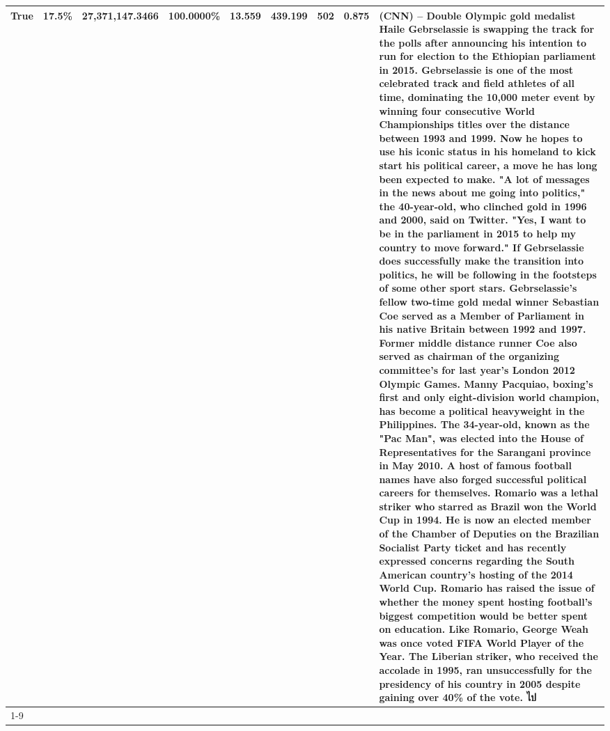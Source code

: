 \begin{table}[H]
{\begin{tabular}{lllrlllll}
True & 17.5\% & 27,371,147.3466 & \bfseries \color{red} 100.0000\% & 13.559 & 439.199 & 502 & 0.875 & (CNN) -- Double Olympic gold medalist Haile Gebrselassie is swapping the track for the polls after announcing his intention to run for election to the Ethiopian parliament in 2015. Gebrselassie is one of the most celebrated track and field athletes of all time, dominating the 10,000 meter event by winning four consecutive World Championships titles over the distance between 1993 and 1999. Now he hopes to use his iconic status in his homeland to kick start his political career, a move he has long been expected to make. "A lot of messages in the news about me going into politics," the 40-year-old, who clinched gold in 1996 and 2000, said on Twitter. "Yes, I want to be in the parliament in 2015 to help my country to move forward." If Gebrselassie does successfully make the transition into politics, he will be following in the footsteps of some other sport stars. Gebrselassie's fellow two-time gold medal winner Sebastian Coe served as a Member of Parliament in his native Britain between 1992 and 1997. Former middle distance runner Coe also served as chairman of the organizing committee's for last year's London 2012 Olympic Games. Manny Pacquiao, boxing's first and only eight-division world champion, has become a political heavyweight in the Philippines. The 34-year-old, known as the "Pac Man", was elected into the House of Representatives for the Sarangani province in May 2010. A host of famous football names have also forged successful political careers for themselves. Romario was a lethal striker who starred as Brazil won the World Cup in 1994. He is now an elected member of the Chamber of Deputies on the Brazilian Socialist Party ticket and has recently expressed concerns regarding the South American country's hosting of the 2014 World Cup. Romario has raised the issue of whether the money spent hosting football's biggest competition would be better spent on education. Like Romario, George Weah was once voted FIFA World Player of the Year. The Liberian striker, who received the accolade in 1995, ran unsuccessfully for the presidency of his country in 2005 despite gaining over 40\% of the vote. ไป \\
\cline{1-9}

\end{tabular}}
\end{table}
